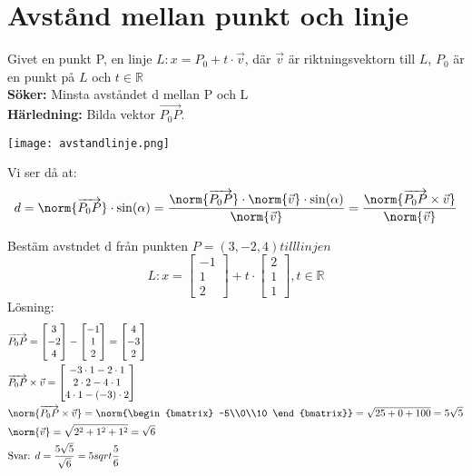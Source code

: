 \section{Avstånd mellan punkt och linje} %
\label{sec:avst_nd_mellan_punkt_och_linje}
Givet en punkt P, en linje $L:x = P_0 + t \cdot \vec{v}$, där $\vec{v}$ är riktningsvektorn till $L$, $P_0$ är en punkt på $L$ och $t \in \mathbb{R}$\\
\textbf{Söker:} Minsta avståndet d mellan P och L\\
\textbf{Härledning:} Bilda vektor $\overrightarrow{P_0P}$. 
\begin{center}
	\texttt{[image: avstandlinje.png]}
\end{center}
Vi ser då at:
\[
    d = \norm{\overrightarrow{P_0P}} \cdot \sin(\alpha) = \frac{\norm{\overrightarrow{P_0P}} \cdot \norm{\vec{v}} \cdot \sin(\alpha)}{\norm{\vec{v}}} = \frac{\norm{\overrightarrow{P_0P} \times \vec{v}}}{\norm{\vec{v}}}
\]
\begin{Ex}
    Bestäm avstndet d från punkten $P=(3,-2,4) till linjen$
    \[
        L:x = \begin{bmatrix} -1\\1\\2 \end{bmatrix} + t \cdot \begin{bmatrix} 2\\1\\1 \end{bmatrix}, t \in \mathbb{R}
    \]
    Lösning:
    \begin{align*}
    	&\overrightarrow{P_0P} = \begin{bmatrix} 3\\-2\\4 \end{bmatrix} - \begin{bmatrix} -1\\1\\2 \end{bmatrix} = \begin{bmatrix} 4\\-3\\2 \end{bmatrix}\\
    	&\overrightarrow{P_0P} \times \vec{v} = \begin{bmatrix} -3 \cdot 1 - 2 \cdot 1\\2 \cdot 2 - 4 \cdot 1\\4 \cdot 1 - (-3) \cdot 2 \end{bmatrix}\\
    	&\norm{\overrightarrow{P_0P} \times \vec{v}} = \norm{\begin{bmatrix} -5\\0\\10 \end{bmatrix}} = \sqrt{25+0+100} = 5 \sqrt{5}\\
    	&\norm{\vec{v}} = \sqrt{2^2+1^2+1^2} = \sqrt{6}\\
    	&\mbox{Svar: } d = \frac{5\sqrt{5}}{\sqrt{6}} = 5 sqrt{\frac{5}{6}}
    \end{align*}
\end{Ex}

